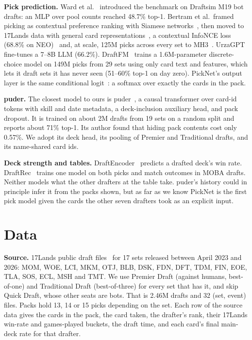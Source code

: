 \documentclass[10pt,letterpaper]{article}
\begin{document}
\textbf{Pick prediction.} Ward et al.~\cite{ward2021} introduced the benchmark on Draftsim M19 bot drafts:
an MLP over pool counts reached 48.7\% top-1. Bertram et al.\ framed picking as contextual preference
ranking with Siamese networks~\cite{bertram2021}, then moved to 17Lands data with general card
representations~\cite{bertram2024general}, a contextual InfoNCE loss (68.8\% on NEO)~\cite{bertram2024infonce}
and, at scale, 125M picks across every set to MH3~\cite{bertram2026}. UrzaGPT~\cite{urzagpt} fine-tunes a 7--8B LLM
(66.2\%). DraftFM~\cite{draftfm} trains a 1.6M-parameter discrete-choice model on 149M picks from 29 sets
using only card text and features, which lets it draft sets it has never seen (51--60\% top-1 on day zero).
PickNet's output layer is the same conditional logit~\cite{mcfadden}: a softmax over exactly the cards in the
pack.

\textbf{puder.} The closest model to ours is puder~\cite{puder}, a causal transformer over card-id tokens with
skill and date metadata, a deck-inclusion auxiliary head, and pack dropout. It is trained on about 2M drafts
from 19 sets on a random split and reports about 71\% top-1. Its author found that hiding pack contents cost
only 0.57\%. We adopt its deck head, its pooling of Premier and Traditional drafts, and its name-shared card
ids.

\textbf{Deck strength and tables.} DraftEncoder~\cite{draftencoder} predicts a drafted deck's win rate.
DraftRec~\cite{draftrec} trains one model on both picks and match outcomes in MOBA drafts. Neither models
what the other drafters at the table take. puder's history could in principle infer it from the packs
shown, but as far as we know PickNet is the first pick model given the cards the other seven drafters took as
an explicit input.

\section{Data}\label{sec:data}

\textbf{Source.} 17Lands public draft files~\cite{17lands} for 17 sets released between April 2023 and
2026: MOM, WOE, LCI, MKM, OTJ, BLB, DSK, FDN, DFT, TDM, FIN, EOE, TLA, SOS, ECL, MSH and TMT. We use Premier Draft
(against humans, best-of-one) and Traditional Draft (best-of-three) for every set that has it, and skip
Quick Draft, whose other seats are bots. That is 2.46M drafts and 32 (set, event) files. Packs hold
13, 14 or 15 picks depending on the set. Each row of the source data gives the cards in the pack, the
card taken, the drafter's rank, their 17Lands win-rate and games-played buckets, the draft time, and each
card's final main-deck rate for that drafter.
\end{document}
